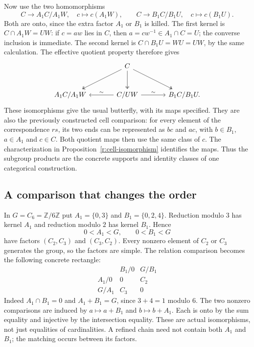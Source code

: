Now use the two homomorphisms
\[
 C\longrightarrow A_1C/A_1W,\quad c\longmapsto c(A_1W),
 \qquad
 C\longrightarrow B_1C/B_1U,\quad c\longmapsto c(B_1U).
\]
Both are onto, since the extra factor $A_1$ or $B_1$ is killed.
The first kernel is $C\cap A_1W=UW$: if $c=aw$ lies in $C$, then
$a=cw^{-1}\in A_1\cap C=U$; the converse inclusion is immediate.
The second kernel is $C\cap B_1U=WU=UW$, by the same calculation.
The effective quotient property therefore gives
\[
\begin{tikzcd}[column sep=large,row sep=large]
 &C\arrow[dl,two heads]\arrow[d,two heads]\arrow[dr,two heads]&\\
 A_1C/A_1W & C/UW\arrow[l,"\sim"']\arrow[r,"\sim"] & B_1C/B_1U .
\end{tikzcd}
\]
These isomorphisms give the usual butterfly, with its maps specified.
They are also the previously constructed cell comparison: for every
element of the correspondence $rs$, its two ends can be represented as
$bc$ and $ac$, with $b\in B_1$, $a\in A_1$ and $c\in C$.
Both quotient maps then use the same class of $c$. The characterization
in Proposition~\ref{r:cell-isomorphism} identifies the maps.
Thus the subgroup products are the concrete supports and identity
classes of one categorical construction.

\subsection{A comparison that changes the order}\label{e:cyclic-six}

In $G=C_6=\mathbb Z/6\mathbb Z$ put $A_1=\{0,3\}$ and
$B_1=\{0,2,4\}$. Reduction modulo $3$ has kernel $A_1$ and reduction
modulo $2$ has kernel $B_1$. Hence
\[
0<A_1<G,\qquad 0<B_1<G
\]
have factors $(C_2,C_3)$ and $(C_3,C_2)$. Every nonzero element of $C_2$
or $C_3$ generates the group, so the factors are simple.
The relation comparison becomes the following concrete rectangle:
\[
\begin{array}{c|cc}
 & B_1/0&G/B_1\\\hline
A_1/0&0&C_2\\
G/A_1&C_3&0
\end{array}
\]
Indeed $A_1\cap B_1=0$ and $A_1+B_1=G$, since $3+4=1$ modulo $6$.
The two nonzero comparisons are induced by $a\mapsto a+B_1$ and
$b\mapsto b+A_1$. Each is onto by the sum equality and injective by the
intersection equality. These are actual isomorphisms, not just equalities
of cardinalities. A refined chain need not contain both $A_1$ and $B_1$;
the matching occurs between its factors.

